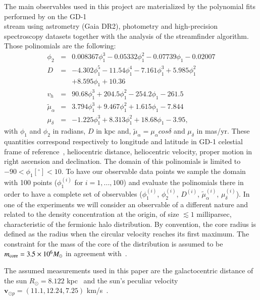 \documentclass[twocolumn]{aa}
\begin{document}
The main observables used in this project are materialized by the polynomial fits performed by
\citet{Ibata_2020} on the GD-1\\ stream using astrometry (Gaia DR2), photometry and high-precision spectroscopy datasets together with the analysis of the {\sc streamfinder} algorithm.
Those polinomials are the following:
\begin{eqnarray}
   \label{Ibata_polyn}
   \phi_2  &=& 0.008367\phi_1^3-0.05332\phi_1^2-0.07739\phi_1-0.02007 \\
   D &=& -4.302\phi_1^5-11.54\phi_1^4-7.161\phi_1^3 +5.985\phi_1^2 \nonumber\\
      &&+ 8.595\phi_1+10.36\\
   v_h &=&  90.68\phi_1^3+204.5\phi_1^2-254.2\phi_1-261.5\\
   \tilde{\mu}_\alpha &=& 3.794\phi_1^3+9.467\phi_1^2+1.615\phi_1-7.844\\
   \mu_\delta &=& -1.225\phi_1^3+8.313\phi_1^2+18.68\phi_1-3.95,
   \label{Ibata_polynb}
\end{eqnarray}
with $\phi_1$ and $\phi_2$ in radians, $D$ in kpc and, $\tilde{\mu}_\alpha=\mu_\alpha cos \delta$ and $\mu_\delta$ in mas/yr. These quantities correspond respectively to longitude and latitude in GD-1 celestial frame of reference~\citep{Koposov_2010}, heliocentric distance, heliocentric velocity, proper motion in right ascension and declination. The domain of this polinomials is limited to $-90<\phi_1[^\circ]<10$.
To have our observable data points we sample the domain with 100 points ($\phi_1^{(i)}$ for $i=1,...,100$)
and evaluate the polinomials there in order to have a complete set of observables ($\phi_1^{(i)}$, $\phi_2^{(i)}$, $D^{(i)}$, $\tilde{\mu}_\alpha^{(i)}$, $\mu_\delta^{(i)}$).
In one of the experiments we will consider an observable of a different nature
and related to the density concentration at the origin, of size $\lesssim 1$ milliparsec,
characteristic of the fermionic halo distribution. By convention, the core radius is defined
as the radius when the circular velocity reaches its first maximum.
The constraint for the mass of the core of the distribution is assumed to be $m_{\rm{core}}=3.5\times10^6 M_\odot$ in agreement with~\citet{2020A&A...641A..34B,2021MNRAS.505L..64B,2022MNRAS.511L..35A}.

The assumed measurements used in this paper are the
galactocentric distance of the sun $R_\odot=8.122$ kpc~\citep{2018A&A...615L..15G} and the sun's peculiar
velocity $\boldsymbol{v}_{\odot p} = (11.1, 12.24, 7.25)$ km/s~\citep{Shonrich}.
\end{document}
